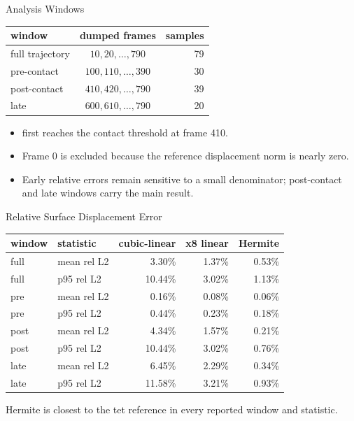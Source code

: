 \documentclass[aspectratio=169,10pt]{beamer}
\newcommand{\case}[1]{\texttt{\detokenize{#1}}}
\newcommand{\pct}[1]{#1\%}
\newcommand{\good}[1]{\textcolor{pgoGreen}{#1}}
\begin{document}
\begin{frame}{Analysis Windows}
  \small
  \begin{table}
    \centering
    \begin{tabular}{lcr}
      \toprule
      window & dumped frames & samples \\
      \midrule
      full trajectory & $10,20,\ldots,790$ & 79 \\
      pre-contact & $100,110,\ldots,390$ & 30 \\
      post-contact & $410,420,\ldots,790$ & 39 \\
      late & $600,610,\ldots,790$ & 20 \\
      \bottomrule
    \end{tabular}
  \end{table}

  \vspace{0.6em}
  \begin{itemize}
    \item \case{tet_ref} first reaches the contact threshold at frame 410.
    \item Frame 0 is excluded because the reference displacement norm is nearly zero.
    \item Early relative errors remain sensitive to a small denominator; post-contact and late windows carry the main result.
  \end{itemize}
\end{frame}

\begin{frame}{Relative Surface Displacement Error}
  \small
  \begin{table}
    \centering
    \begin{tabular}{llrrr}
      \toprule
      window & statistic & cubic-linear & x8 linear & Hermite \\
      \midrule
      full & mean rel L2 & \pct{3.30} & \pct{1.37} & \good{\pct{0.53}} \\
      full & p95 rel L2 & \pct{10.44} & \pct{3.02} & \good{\pct{1.13}} \\
      pre & mean rel L2 & \pct{0.16} & \pct{0.08} & \good{\pct{0.06}} \\
      pre & p95 rel L2 & \pct{0.44} & \pct{0.23} & \good{\pct{0.18}} \\
      post & mean rel L2 & \pct{4.34} & \pct{1.57} & \good{\pct{0.21}} \\
      post & p95 rel L2 & \pct{10.44} & \pct{3.02} & \good{\pct{0.76}} \\
      late & mean rel L2 & \pct{6.45} & \pct{2.29} & \good{\pct{0.34}} \\
      late & p95 rel L2 & \pct{11.58} & \pct{3.21} & \good{\pct{0.93}} \\
      \bottomrule
    \end{tabular}
  \end{table}

  \vspace{0.5em}
  Hermite is closest to the tet reference in every reported window and statistic.
\end{frame}
\end{document}
